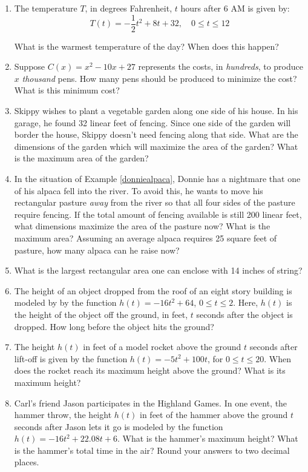 \documentclass{ximera}
\begin{document}
\begin{enumerate}
\item  The temperature $T$, in degrees Fahrenheit, $t$ hours after 6 AM is given by: \[ T(t) = -\frac{1}{2} t^2 + 8t+32, \quad 0 \leq t \leq 12\]

What is the warmest temperature of the day?  When does this happen?

\item  Suppose $C(x) = x^2-10x+27$ represents the costs, in \textit{hundreds}, to produce $x$ \textit{thousand} pens.  How many pens should be produced to minimize the cost?  What is this minimum cost?

\item \label{fixedperimetermaxareagarden} Skippy wishes to plant a vegetable garden along one side of his house.  In his garage, he found 32 linear feet of fencing.  Since one side of the garden will border the house, Skippy doesn't need fencing along that side.  What are the dimensions of the garden which will maximize the area of the garden?  What is the maximum  area of the garden?

\item In the situation of Example \ref{donniealpaca}, Donnie has a nightmare that one of his alpaca fell into the river.  To avoid this, he wants to move his rectangular pasture \textit{away} from the river so that all four sides of the pasture require fencing.  If the total amount of fencing available is still 200 linear feet, what dimensions maximize the area of the pasture now?  What is the maximum area?  Assuming an average alpaca requires 25 square feet of pasture, how many alpaca can he raise now?

\item What is the largest rectangular area one can enclose with 14 inches of string?


\item  The height of an object dropped from the roof of an eight story building is modeled by  by the function $h(t) = -16t^2 + 64$, $0 \leq t \leq 2$. Here,  $h(t)$ is the height of the object off the ground, in feet, $t$ seconds after the object is dropped.  How long before the object hits the ground?

\item  The height $h(t)$ in feet of a model rocket above the ground $t$ seconds after lift-off is given by the function $h(t) = -5t^2+100t$, for $0 \leq t \leq 20$.  When does the rocket reach its maximum height above the ground?  What is its maximum height?

\item\label{JasonHammerExercise1}  Carl's friend Jason participates in the Highland Games. In one event, the hammer throw, the height $h(t)$ in feet of the hammer above the ground $t$ seconds after Jason lets it go is modeled by the function $h(t) = -16t^2 +  22.08t + 6$.  What is the hammer's maximum height?  What is the hammer's total time in the air? Round your answers to two decimal places.



\end{enumerate}
\end{document}
